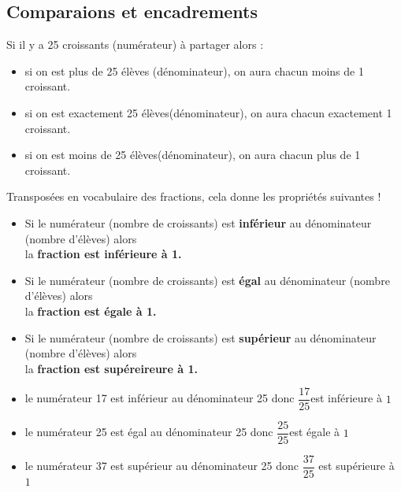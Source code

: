 \begin{changemargin}{0mm}{-15mm}
    \section{Comparaions et encadrements}
    \begin{remarque}

        Si il y a 25 croissants (numérateur) à partager alors :
        \begin{itemize}
            \item si on est plus de 25 élèves (dénominateur), on aura chacun moins de 1 croissant.
            \item si on est exactement 25 élèves(dénominateur), on aura chacun exactement 1 croissant.
            \item si on est moins de 25 élèves(dénominateur), on aura chacun plus de 1 croissant.
        \end{itemize}
        Transposées en vocabulaire des fractions, cela donne les propriétés suivantes !
    \end{remarque}
\begin{propriete}[\admise]
    \begin{itemize}
        \item Si le numérateur (nombre de croissants) est \textbf{inférieur} au dénominateur (nombre d'élèves) alors \\la \textbf{fraction est inférieure à 1.}
        \item Si le numérateur (nombre de croissants) est \textbf{égal} au dénominateur (nombre d'élèves) alors \\la \textbf{fraction est égale à 1.}
        \item Si le numérateur (nombre de croissants) est \textbf{supérieur} au dénominateur (nombre d'élèves) alors \\la \textbf{fraction est supéreireure à 1.}
    \end{itemize}
\end{propriete}
\begin{exemples*1} 
    \begin{itemize}
        \item le numérateur 17 est inférieur au dénominateur 25 donc $\dfrac{17}{25}$est inférieure à $1$
        \item le numérateur 25 est égal au dénominateur 25 donc $\dfrac{25}{25}$est égale à $1$
        \item le numérateur 37 est supérieur au dénominateur 25 donc $\dfrac{37}{25}$ est supérieure à $1$
    \end{itemize}
    \vspace*{-5mm}
\end{exemples*1} 


\end{changemargin}
